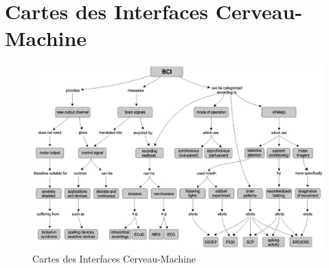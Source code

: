 \pagestyle{plain}

\section{Cartes des Interfaces Cerveau-Machine \citep{graimann_braincomputer_2009}}
\begin{figure}[H]
	\centering
	\includegraphics[scale=0.5,angle=-90]{./figures/Grainmann_2002_ICM_map}
	\caption{Cartes des Interfaces Cerveau-Machine \citep{graimann_braincomputer_2009}}
	\label{bci_map}
\end{figure}

